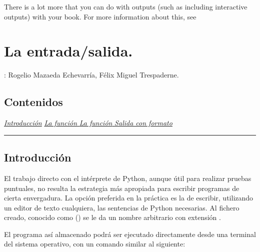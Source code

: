\documentclass[letterpaper,10pt,english]{sphinxmanual}
\begin{document}
\noindent{}

There is a lot more that you can do with outputs (such as including interactive outputs)
with your book. For more information about this, see 


\section{La entrada/salida.}
\label{\detokenize{Entrada_salida:la-entrada-salida}}\label{\detokenize{Entrada_salida::doc}}
: Rogelio Mazaeda Echevarría, Félix Miguel Trespaderne.


\subsection{Contenidos}
\label{\detokenize{Entrada_salida:contenidos}}
{\hyperref[\detokenize{Entrada_salida:Introducci_C3_B3n}]{\emph{Introducción}}}
{\hyperref[\detokenize{Entrada_salida:La_funci_C3_B3n_print()}]{\emph{La función }}}
{\hyperref[\detokenize{Entrada_salida:La_funci_C3_B3n_input()}]{\emph{La función }}}
{\hyperref[\detokenize{Entrada_salida:Salida_con_formato}]{\emph{Salida con formato}}}


\bigskip\hrule\bigskip





\subsection{Introducción}
\label{\detokenize{Entrada_salida:introduccion}}
El trabajo directo con el intérprete de Python, aunque útil para realizar pruebas puntuales, no resulta la estrategia más apropiada para escribir programas de cierta envergadura.
La opción preferida en la práctica es la de escribir, utilizando un editor de texto cualquiera, las sentencias de Python necesarias. Al fichero creado, conocido como  () se le da un nombre arbitrario con extensión .

El programa así almacenado podrá ser ejecutado directamente desde una terminal del sistema operativo, con un comando similar al siguiente:

\begin{sphinxVerbatim}[commandchars=\\\{\}]
 
\end{sphinxVerbatim}
\end{document}
